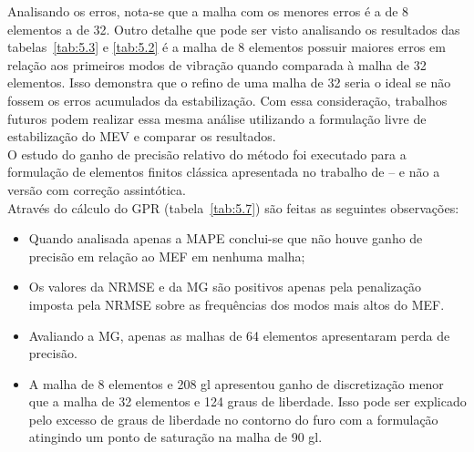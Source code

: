 \indent Analisando os erros, nota-se que a malha com os menores erros é a de 8 elementos a de 32. 
\indent Outro detalhe que pode ser visto analisando os resultados das tabelas~\ref{tab:5.3} e \ref{tab:5.2} é a malha de 8 elementos possuir maiores erros em relação aos primeiros modos de vibração quando comparada à malha de 32 elementos. Isso demonstra que o refino de uma malha de 32 seria o ideal se não fossem os erros acumulados da estabilização. Com essa consideração, trabalhos futuros podem realizar essa mesma análise utilizando a formulação livre de estabilização do MEV e comparar os resultados.\\
\indent O estudo do ganho de precisão relativo do método foi executado para a formulação de elementos finitos clássica apresentada no trabalho de \citet{asymptoticsolutionspredictednaturalfrequenciestwodimensionalelasticsolidvibrationproblemsfiniteelementanalysis1996} -- e não a versão com correção assintótica.\\
\indent Através do cálculo do GPR (tabela~\ref{tab:5.7}) são feitas as seguintes observações:
\begin{itemize}
    \item Quando analisada apenas a MAPE conclui-se que não houve ganho de precisão em relação ao MEF em nenhuma malha;
    \item Os valores da NRMSE e da MG são positivos apenas pela penalização imposta pela NRMSE sobre as frequências dos modos mais altos do MEF. 
    \item Avaliando a MG, apenas as malhas de 64 elementos apresentaram perda de precisão.
    \item A malha de 8 elementos e 208 gl apresentou ganho de discretização menor que a malha de 32 elementos e 124 graus de liberdade. Isso pode ser explicado pelo excesso de graus de liberdade no contorno do furo com a formulação atingindo um ponto de saturação na malha de 90 gl.
\end{itemize}


